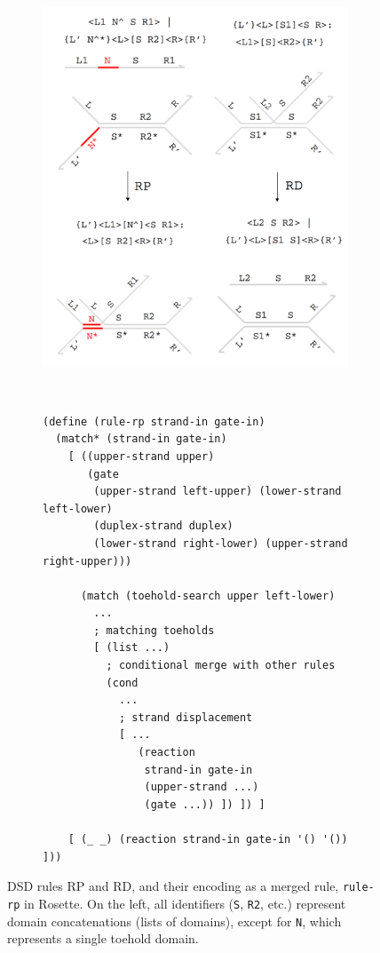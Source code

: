 \documentclass{article}[10pt]
\begin{document}
\begin{figure}[h]
\centering
\begin{subfigure}[c]{0.35\textwidth}
\includegraphics[width=\textwidth]{figures/rule-merge.png}
\end{subfigure}
~
\begin{subfigure}[c]{0.5\textwidth}
\begin{lstlisting}[basicstyle=\scriptsize\ttfamily]
(define (rule-rp strand-in gate-in)
  (match* (strand-in gate-in)
    [ ((upper-strand upper)
       (gate
        (upper-strand left-upper) (lower-strand left-lower)
        (duplex-strand duplex)
        (lower-strand right-lower) (upper-strand right-upper)))

      (match (toehold-search upper left-lower)
        ...
        ; matching toeholds
        [ (list ...)
          ; conditional merge with other rules
          (cond
            ...
            ; strand displacement
            [ ...
               (reaction
                strand-in gate-in
                (upper-strand ...)
                (gate ...)) ]) ]) ]

    [ (_ _) (reaction strand-in gate-in '() '()) ]))
\end{lstlisting}
\end{subfigure}
\caption{
DSD rules RP and RD, and their encoding as a merged rule, \lstinline{rule-rp} in
Rosette.  On the left, all identifiers (\lstinline{S}, \lstinline{R2}, etc.)
represent domain concatenations (lists of domains), except for \lstinline{N},
which represents a single toehold domain.
}
\label{figure:example-rule}
\end{figure}
\end{document}
